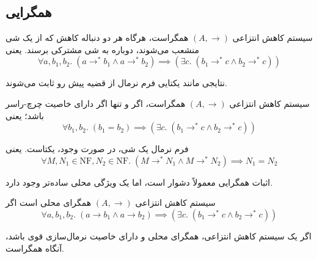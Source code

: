 \subsection*{همگرایی}

\begin{defn}
سیستم کاهش انتزاعی
$(A,\rightarrow)$
همگراست، هرگاه هر دو دنباله کاهش که از یک شی منشعب می‌شوند، دوباره به شی مشترکی برسند. یعنی
\begin{equation*}
\forall a,b_1,b_2.\;(a \rightarrow^* b_1 \land a \rightarrow^* b_2) \implies (\exists c.\; (b_1 \rightarrow^* c \land b_2 \rightarrow^* c))
\end{equation*}
\end{defn}

نتایجی مانند یکتایی فرم نرمال از قضیه پیش رو ثابت می‌شوند.

\begin{thm}
سیستم کاهش انتزاعی
$(A,\rightarrow)$
همگراست، اگر و تنها اگر دارای خاصیت چرچ-راسر باشد؛ یعنی
\begin{equation*}
\forall b_1,b_2.\;(b_1 = b_2) \implies (\exists c.\; (b_1 \rightarrow^* c \land b_2 \rightarrow^* c))
\end{equation*}
\end{thm}

\begin{cor}
فرم نرمال یک شی، در صورت وجود، یکتاست. یعنی
\begin{equation*}
\forall M, N_1 \in \mathrm{NF}, N_2 \in \mathrm{NF}.\;(M \rightarrow^* N_1 \land M \rightarrow^* N_2 ) \implies N_1 = N_2
\end{equation*}
\end{cor}

اثبات همگرایی معمولاً دشوار است، اما یک ویژگی محلی ساده‌تر وجود دارد.

\begin{defn}
سیستم کاهش انتزاعی
$(A,\rightarrow)$
همگرای محلی است اگر
\begin{equation*}
\forall a,b_1,b_2.\;(a \rightarrow b_1 \land a \rightarrow b_2) \implies (\exists c.\; (b_1 \rightarrow^* c \land b_2 \rightarrow^* c))
\end{equation*}
\end{defn}

\begin{lmm}
اگر یک سیستم کاهش انتزاعی، همگرای محلی و دارای خاصیت نرمال‌سازی قوی باشد، آنگاه همگراست.
\end{lmm}

